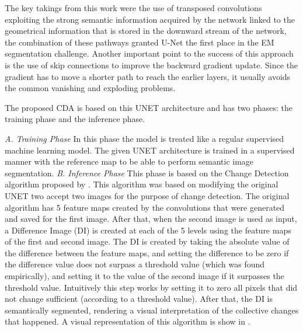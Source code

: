 The key takings from this work were the use of transposed convolutions exploiting the strong semantic information acquired by the network linked to the geometrical information that is stored in the downward stream of the network, the combination of these pathways granted U-Net the first place in the EM segmentation challenge. Another important point to the success of this approach is the use of skip connections to improve the backward gradient update. Since the gradient has to move a shorter path to reach the earlier layers, it usually avoids the common vanishing and exploding problems.

The proposed CDA is based on this UNET architecture and has two phases: the training phase and the inference phase.

\textit{A. Training Phase}
\newline
In this phase the model is treated like a regular supervised machine learning model. The given UNET architecture is trained in a supervised manner with the reference map
to be able to perform semantic image segmentation. 
\newline
\textit{B. Inference Phase}
\newline
This phase is based on the Change Detection algorithm proposed by \cite{Kevin}. This algorithm was based on modifying the original UNET two accept two images for the purpose of change detection.
The original algorithm has 5 feature maps created by the convolutions that were generated and saved for the first image. After that, when the second image is used as input, a Difference Image (DI) is
created at each of the 5 levels using the feature maps of the first and second image.
The DI is created by taking the absolute value of the difference between the feature maps, and setting the difference to be zero if the difference value does not surpass a threshold value (which was found empirically), and setting it to 
the value of the second image if it surpasses the threshold value. Intuitively this step works by setting it to zero all pixels that did not change sufficient (according to a threshold value). After that, the DI is semantically segmented, rendering a visual 
interpretation of the collective changes that happened. A visual representation of this algorithm is show in .

